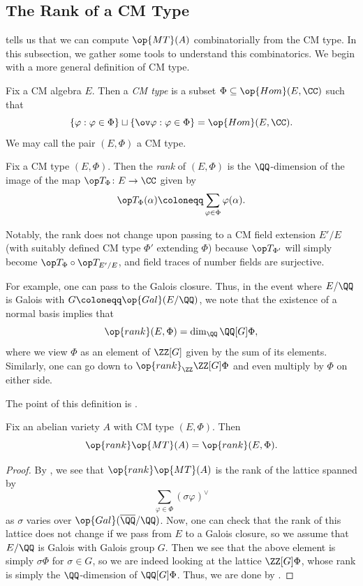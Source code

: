 \documentclass{article}
\begin{document}
\subsection{The Rank of a CM Type}
 tells us that we can compute $\op{MT}(A)$ combinatorially from the CM type. In this subsection, we gather some tools to understand this combinatorics. We begin with a more general definition of CM type.
\begin{definition}[CM type]
	Fix a CM algebra $E$. Then a \textit{CM type} is a subset $\Phi\subseteq\op{Hom}(E,\CC)$ such that
	\[\{\varphi:\varphi\in\Phi\}\sqcup\{\ov\varphi:\varphi\in\Phi\}=\op{Hom}(E,\CC).\]
	We may call the pair $(E,\Phi)$ a CM type.
\end{definition}
\begin{definition}[rank]
	Fix a CM type $(E,\Phi)$. Then the \textit{rank} of $(E,\Phi)$ is the $\QQ$-dimension of the image of the map $\op T_\Phi\colon E\to\CC$ given by
	\[\op T_\Phi(\alpha)\coloneqq\sum_{\varphi\in\Phi}\varphi(\alpha).\]
\end{definition}
\begin{remark} \label{rem:galois-cm-type-rank}
	Notably, the rank does not change upon passing to a CM field extension $E'/E$ (with suitably defined CM type $\Phi'$ extending $\Phi$) because $\op T_{\Phi'}$ will simply become ${\op T_\Phi}\circ\op T_{E'/E}$, and field traces of number fields are surjective.
	
	For example, one can pass to the Galois closure. Thus, in the event where $E/\QQ$ is Galois with $G\coloneqq\op{Gal}(E/\QQ)$, we note that the existence of a normal basis implies that
	\[\op{rank}(E,\Phi)=\dim_\QQ\QQ[G]\Phi,\]
	where we view $\Phi$ as an element of $\ZZ[G]$ given by the sum of its elements. Similarly, one can go down to $\op{rank}_\ZZ\ZZ[G]\Phi$ and even multiply by $\Phi$ on either side.
\end{remark}
The point of this definition is .
\begin{proposition}
	Fix an abelian variety $A$ with CM type $(E,\Phi)$. Then
	\[\op{rank}\op{MT}(A)=\op{rank}(E,\Phi).\]
\end{proposition}
\begin{proof}
	By , we see that $\op{rank}\op{MT}(A)$ is the rank of the lattice spanned by
	\[\sum_{\varphi\in\Phi}(\sigma\varphi)^\lor\]
	as $\sigma$ varies over $\op{Gal}(\overline\QQ/\QQ)$. Now, one can check that the rank of this lattice does not change if we pass from $E$ to a Galois closure, so we assume that $E/\QQ$ is Galois with Galois group $G$. Then we see that the above element is simply $\sigma\Phi$ for $\sigma\in G$, so we are indeed looking at the lattice $\ZZ[G]\Phi$, whose rank is simply the $\QQ$-dimension of $\QQ[G]\Phi$. Thus, we are done by .
\end{proof}
\end{document}
